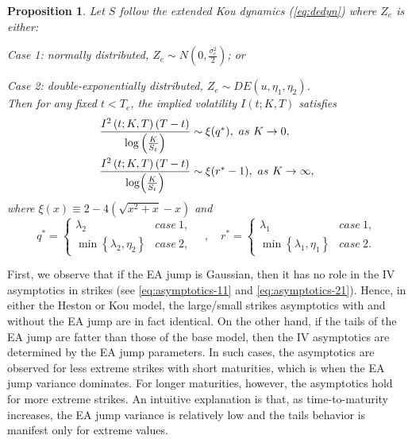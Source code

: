 \documentclass[11pt]{article}
\newtheorem{prop}[theorem]{Proposition}
\numberwithin{equation}{section}
\numberwithin{theorem}{section}
\begin{document}
 \begin{prop}\label{prop:asy2}
Let $S$ follow  the extended Kou dynamics (\ref{eq:dedyn}) where
$Z_{e}$ is either: 

Case 1: normally distributed, $Z_{e}\sim N\left(0,\frac{\sigma_{e}^{2}}{2}\right)$;
or

Case 2: double-exponentially distributed, $Z_{e}\sim DE\left(u,\eta_{1},\eta_{2}\right)$. \\
Then for any fixed $t<T_{e}$, the implied volatility  $I\left(t;K,T\right)$ satisfies 
\begin{align}
\frac{I^{2}\left(t;K,T\right)\left(T-t\right)}{{\log}\left(\frac{K}{S_{t}}\right)} & \sim\mbox{\ensuremath{\xi}\ensuremath{\ensuremath{\left(q^{*}\right)}}},\ as\ \ensuremath{K}\rightarrow\ensuremath{0},\label{eq:asymptotics-21} \\
\frac{\mbox{\ensuremath{I^{2}\left(t;K,T\right)\left(T-t\right)}}}{{\log}\mbox{\ensuremath{\left(\frac{K}{S_{t}}\right)}}} & \sim\mbox{\ensuremath{\xi}\ensuremath{\ensuremath{\left(r^{*}-1\right)}}},\ as\ \ensuremath{K}\rightarrow\ensuremath{\infty},\label{eq:asymptotics-22}
\end{align}
where $\xi\left(x\right)\equiv2-4\left(\sqrt{x^{2}+x}-x\right)$
and
\[
q^{*}=\begin{cases}
\lambda_{2} & case\ 1,\\
\min\left\{ \lambda_{2},\eta_{2}\right\}  & case\ 2,
\end{cases}\quad,\quad r^{*}=\begin{cases}
\lambda_{1} & case\ 1,\\
\min\left\{ \lambda_{1},\eta_{1}\right\}  & case\ 2.
\end{cases}
\]

\end{prop}

First, we observe that if the EA jump is Gaussian, then it has no role in  the IV asymptotics in strikes (see \eqref{eq:asymptotics-11} and \eqref{eq:asymptotics-21}). Hence,  in either the Heston or Kou model, the large/small strikes asymptotics  with and without the EA jump are in fact identical.   On the other hand, if the tails of the EA jump are fatter than those
of the base model, then the IV asymptotics are determined by the EA
jump parameters. In such cases,
  the asymptotics are observed  for less extreme strikes
with  short maturities, which is   when the EA jump variance dominates. For longer
maturities, however,  the asymptotics  hold for  more extreme strikes.
An intuitive explanation is that, as time-to-maturity increases, the EA jump variance is relatively
low and the tails behavior is manifest only for extreme values. 
\end{document}
